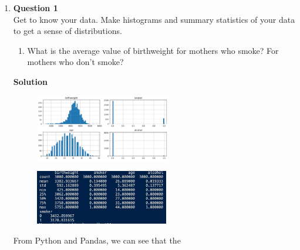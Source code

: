 \documentclass{uofa-eng-assignment}
\begin{document}
 \maketitle
\begin{enumerate}
    \item[] \textbf{Question 1} \\
        Get to know your data. Make histograms and summary statistics of your data to get a sense of
        distributions.
        \begin{enumerate}
            \item What is the average value of birthweight for mothers who smoke? For mothers who
                  don’t smoke?
        \end{enumerate}
        \textbf{Solution}
        \begin{figure}[H]
            \centering
            \includegraphics[width=0.558\textwidth]{p2-1-1.png}
        \end{figure}
        \begin{figure}[H]
            \centering
            \includegraphics[width=0.55\textwidth]{p2-1-2.png}
        \end{figure}
        From Python and Pandas, we can see that the

\end{enumerate}
\end{document}
